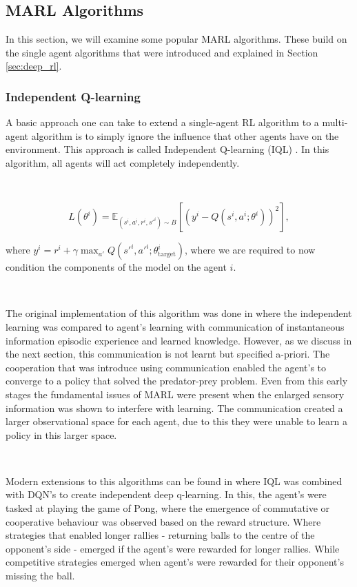\documentclass{article}
\begin{document}
\subsection{MARL Algorithms}\label{sec:marl_algorithms}

In this section, we will examine some popular MARL algorithms. These build on the single agent algorithms that were introduced and explained in Section \ref{sec:deep_rl}. 

\subsubsection{Independent Q-learning}

A basic approach one can take to extend a single-agent RL algorithm to a multi-agent algorithm is to simply ignore the influence that other agents have on the environment. This approach is called Independent Q-learning (IQL) \citep{tan1997MultiAgentRL}. In this algorithm, all agents will act completely independently.

\

\begin{equation}
L(\theta^i) = \mathbb{E}_{(s^i, a^i, r^i, s'^i) \sim B} \left[ \left( y^i - Q(s^i, a^i; \theta^i) \right)^2 \right],
\end{equation}

where $y^i = r^i + \gamma \max_{a'} Q(s'^i, a'^i; \theta^i_\text{target})$, where we are required to now condition the components of the model on the agent $i$.

\

The original implementation of this algorithm was done in \citet{tan1997MultiAgentRL} where the independent learning was compared to agent's learning with communication of instantaneous information episodic experience and learned knowledge. However, as we discuss in the next section, this communication is not learnt but specified a-priori. The cooperation that was introduce using communication enabled the agent's to converge to a policy that solved the predator-prey problem. Even from this early stages the fundamental issues of MARL were present when the enlarged sensory information was shown to interfere with learning. The communication created a larger observational space for each agent, due to this they were unable to learn a policy in this larger space. \citep{tampuu2015multiagent}

\

Modern extensions to this algorithms can be found in \citet{tampuu2015multiagent} where IQL was combined with DQN's to create independent deep q-learning. In this, the agent's were tasked at playing the game of Pong, where the emergence of commutative or cooperative behaviour was observed based on the reward structure. Where strategies that enabled longer rallies - returning balls to the centre of the opponent's side - emerged if the agent's were rewarded for longer rallies. While competitive strategies emerged when agent's were rewarded for their opponent's missing the ball.
\end{document}
